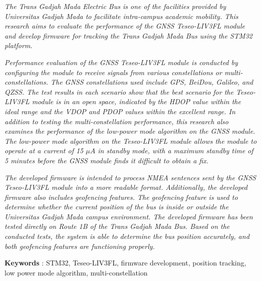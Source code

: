\textit{The Trans Gadjah Mada Electric Bus is one of the facilities provided by Universitas Gadjah Mada to facilitate intra-campus academic mobility. This research aims to evaluate the performance of the GNSS Teseo\hyp{}LIV3FL module and develop firmware for tracking the Trans Gadjah Mada Bus using the STM32 platform.}

\textit{Performance evaluation of the GNSS Teseo\hyp{}LIV3FL module is conducted by configuring the module to receive signals from various constellations or multi-constellations. The GNSS constellations used include GPS, BeiDou, Galileo, and QZSS. The test results in each scenario show that the best scenario for the Teseo\hyp{}LIV3FL module is in an open space, indicated by the HDOP value within the ideal range and the VDOP and PDOP values within the excellent range. In addition to testing the multi-constellation performance, this research also examines the performance of the low-power mode algorithm on the GNSS module. The low-power mode algorithm on the Teseo\hyp{}LIV3FL module allows the module to operate at a current of 15 $\mu A$ in standby mode, with a maximum standby time of 5 minutes before the GNSS module finds it difficult to obtain a fix.}

\textit{The developed firmware is intended to process NMEA sentences sent by the GNSS Teseo\hyp{}LIV3FL module into a more readable format. Additionally, the developed firmware also includes geofencing features. The geofencing feature is used to determine whether the current position of the bus is inside or outside the Universitas Gadjah Mada campus environment. The developed firmware has been tested directly on Route 1B of the Trans Gadjah Mada Bus. Based on the conducted tests, the system is able to determine the bus position accurately, and both geofencing features are functioning properly.}

\noindent\textbf{Keywords} : STM32, Teseo\hyp{}LIV3FL, firmware development, position tracking, low power mode algorithm, multi-constellation